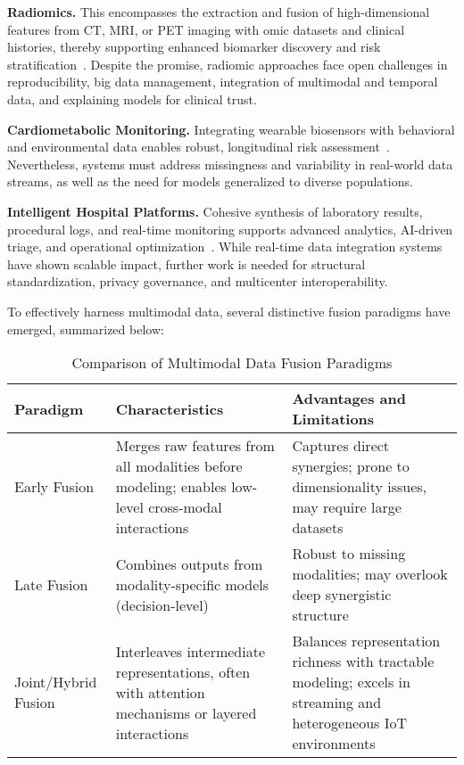 \documentclass[sigconf]{acmart}
\begin{document}
\textbf{Radiomics.} This encompasses the extraction and fusion of high-dimensional features from CT, MRI, or PET imaging with omic datasets and clinical histories, thereby supporting enhanced biomarker discovery and risk stratification~\cite{ref46,ref53,ref50,ref54}. Despite the promise, radiomic approaches face open challenges in reproducibility, big data management, integration of multimodal and temporal data, and explaining models for clinical trust.

\textbf{Cardiometabolic Monitoring.} Integrating wearable biosensors with behavioral and environmental data enables robust, longitudinal risk assessment~\cite{ref86,ref90,ref89}. Nevertheless, systems must address missingness and variability in real-world data streams, as well as the need for models generalized to diverse populations.

\textbf{Intelligent Hospital Platforms.} Cohesive synthesis of laboratory results, procedural logs, and real-time monitoring supports advanced analytics, AI-driven triage, and operational optimization~\cite{ref84,ref106}. While real-time data integration systems have shown scalable impact, further work is needed for structural standardization, privacy governance, and multicenter interoperability.

To effectively harness multimodal data, several distinctive fusion paradigms have emerged, summarized below:

\begin{table*}[htbp]
\centering
\caption{Comparison of Multimodal Data Fusion Paradigms}
\label{tab:fusion_paradigms}
\begin{adjustbox}{max width=\textwidth}
\begin{tabular}{lll}
\toprule
\textbf{Paradigm} & \textbf{Characteristics} & \textbf{Advantages and Limitations} \\
\midrule
Early Fusion & Merges raw features from all modalities before modeling; enables low-level cross-modal interactions & Captures direct synergies; prone to dimensionality issues, may require large datasets \\
Late Fusion & Combines outputs from modality-specific models (decision-level) & Robust to missing modalities; may overlook deep synergistic structure \\
Joint/Hybrid Fusion & Interleaves intermediate representations, often with attention mechanisms or layered interactions & Balances representation richness with tractable modeling; excels in streaming and heterogeneous IoT environments \\
\bottomrule
\end{tabular}
\end{adjustbox}
\end{table*}
\end{document}

